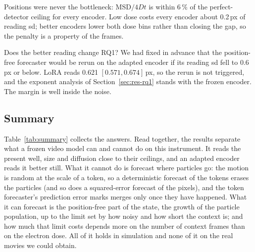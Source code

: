 Positions were never the bottleneck: MSD$/4Dt$ is within 6\,\% of the perfect-detector
ceiling for every encoder. Low dose costs every encoder about 0.2\,px of reading sd;
better encoders lower both dose bins rather than closing the gap, so the penalty is a
property of the frames.

Does the better reading change RQ1? We had fixed in advance that the position-free
forecaster would be rerun on the adapted encoder if its reading sd fell to 0.6\,px or
below. LoRA reads 0.621 $[0.571, 0.674]$\,px, so the rerun is not triggered, and the
exponent analysis of Section~\ref{sec:res-rq1} stands with the frozen encoder. The margin
is well inside the noise.

\subsection{Summary}
\label{sec:res-summary}

Table~\ref{tab:summary} collects the answers. Read together, the results separate what a
frozen video model can and cannot do on this instrument. It reads the present well, size
and diffusion close to their ceilings, and an adapted encoder reads it better still. What
it cannot do is forecast where particles go: the motion is random at the scale of a token,
so a deterministic forecast of the tokens erases the particles (and so does a
squared-error forecast of the pixels), and the token forecaster's prediction error marks
merges only once they have happened. What it can forecast is the position-free part
of the state, the growth of the particle population, up to the limit set by how noisy and
how short the context is; and how much that limit costs depends more on the number of
context frames than on the electron dose. All of it holds in simulation and none of it on
the real movies we could obtain.

